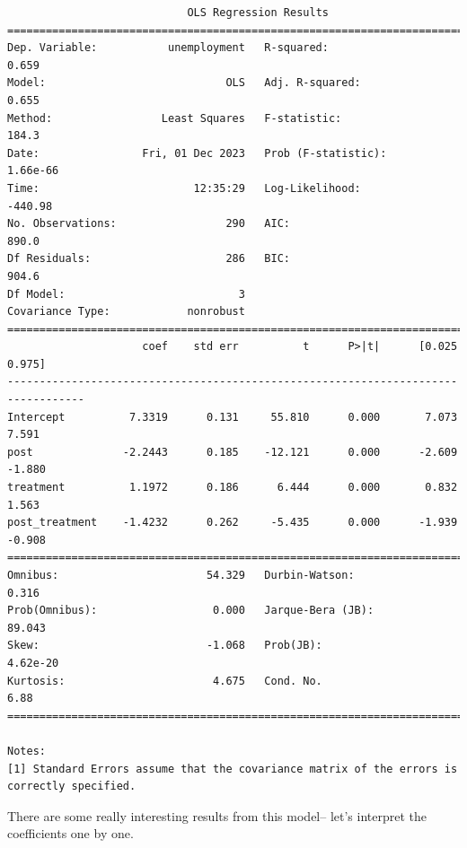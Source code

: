 \documentclass[
  letterpaper,
  DIV=11,
  numbers=noendperiod]{scrreprt}
\begin{document}
\begin{verbatim}
                            OLS Regression Results                            
==============================================================================
Dep. Variable:           unemployment   R-squared:                       0.659
Model:                            OLS   Adj. R-squared:                  0.655
Method:                 Least Squares   F-statistic:                     184.3
Date:                Fri, 01 Dec 2023   Prob (F-statistic):           1.66e-66
Time:                        12:35:29   Log-Likelihood:                -440.98
No. Observations:                 290   AIC:                             890.0
Df Residuals:                     286   BIC:                             904.6
Df Model:                           3                                         
Covariance Type:            nonrobust                                         
==================================================================================
                     coef    std err          t      P>|t|      [0.025      0.975]
----------------------------------------------------------------------------------
Intercept          7.3319      0.131     55.810      0.000       7.073       7.591
post              -2.2443      0.185    -12.121      0.000      -2.609      -1.880
treatment          1.1972      0.186      6.444      0.000       0.832       1.563
post_treatment    -1.4232      0.262     -5.435      0.000      -1.939      -0.908
==============================================================================
Omnibus:                       54.329   Durbin-Watson:                   0.316
Prob(Omnibus):                  0.000   Jarque-Bera (JB):               89.043
Skew:                          -1.068   Prob(JB):                     4.62e-20
Kurtosis:                       4.675   Cond. No.                         6.88
==============================================================================

Notes:
[1] Standard Errors assume that the covariance matrix of the errors is correctly specified.
\end{verbatim}

There are some really interesting results from this model-- let's
interpret the coefficients one by one.
\end{document}
